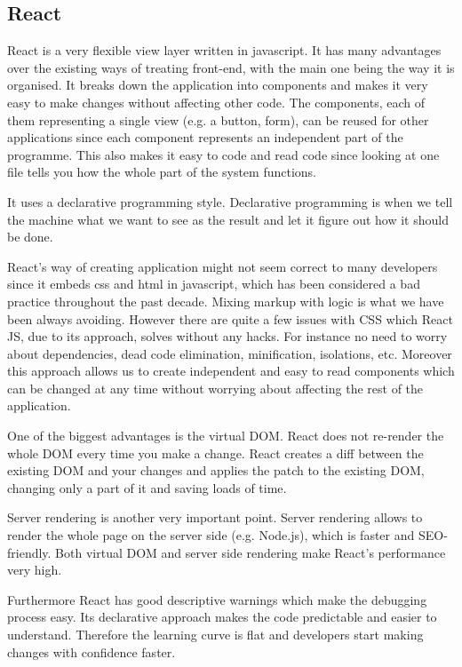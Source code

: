 \documentclass[thesis=M,english]{FITthesis}[2012/10/20]
\begin{document}
\newpage
\subsection{React}
React is a very flexible view layer written in javascript. 
It has many advantages over the existing ways of treating front-end, with the main one being the way it is organised. It breaks down the application into components and makes it very easy to make changes without affecting other code. The components, each of them representing a single view (e.g. a button, form), can be reused for other applications since each component represents an independent part of the programme. This also makes it easy to code and read code since looking at one file tells you how the whole part of the system functions. \cite{react-ant}

It uses a declarative programming style. Declarative programming is when we tell the machine what we want to see as the result and let it figure out how it should be done. \cite{react-fb}

React's way of creating application might not seem correct to many developers since it embeds css and html in javascript, which has been considered a bad practice throughout the past decade. Mixing markup with logic is what we have been always avoiding. However there are quite a few issues with CSS which React JS, due to its approach, solves without any hacks. For instance no need to worry about dependencies, dead code elimination, minification, isolations, etc. Moreover this approach allows us to create independent and easy to read components which can be changed at any time without worrying about affecting the rest of the application.

One of the biggest advantages is the virtual DOM. React does not re-render the whole DOM every time you make a change. React creates a diff between the existing DOM and your changes and applies the patch to the existing DOM, changing only a part of it and saving loads of time.

Server rendering is another very important point. Server rendering allows to render the whole page on the server side (e.g. Node.js), which is faster and SEO-friendly. Both virtual DOM and server side rendering make React's performance very high.

Furthermore React has good descriptive warnings which make the debugging process easy. Its declarative approach makes the code predictable and easier to understand. Therefore the learning curve is flat and developers start making changes with confidence faster. 
\end{document}
